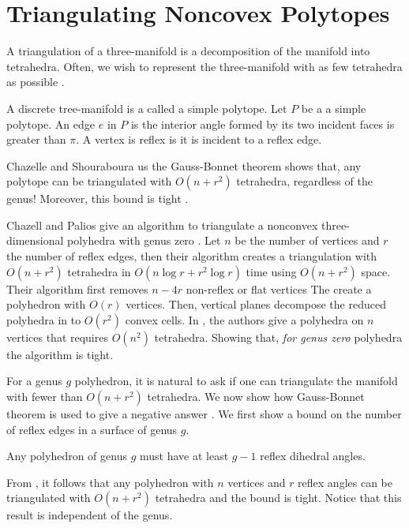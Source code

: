 \section{Triangulating Noncovex Polytopes}
\label{sec:triangulating}

A triangulation of a three-manifold is a decomposition
of the manifold into tetrahedra.
Often, we wish to represent the three-manifold
with as few tetrahedra as possible \cite{simplify-mesh-1999}.

A discrete tree-manifold is a called a simple polytope.
Let $P$ be a a simple polytope. An edge $e$ in $P$ is
 the interior angle formed by its two incident faces
is greater than $\pi$.
A vertex is reflex is it is incident to a reflex edge.


Chazelle and Shouraboura us the 
 Gauss-Bonnet theorem shows that, any polytope
can be triangulated with $O(n+r^2)$ tetrahedra, regardless  of 
the genus! Moreover, this bound is tight \cite{tetra-bounds-c-s-1994}.


Chazell and Palios give an
algorithm to triangulate a nonconvex three-dimensional polyhedra with genus
zero \cite{triangulating-polytope-1990}.
Let $n$ be the number of vertices and $r$ the number of reflex edges,
then their algorithm creates a triangulation with $O(n+r^2)$ tetrahedra 
in $O(n\log r +r^2\log r)$ time using $O(n+r^2)$ space.
Their algorithm first removes $n-4r$ non-reflex or flat vertices
The create a polyhedron with $O(r)$ vertices.
Then, vertical planes decompose the reduced polyhedra in to
$O(r^2)$ convex cells.
In \cite{7}, the authors give a polyhedra on $n$ vertices that requires
$O(n^2)$ tetrahedra. Showing that, \emph{for genus zero} polyhedra
the algorithm is tight.


For a genus $g$ polyhedron, it is natural to ask if one can 
triangulate the manifold with fewer than $O(n+r^2)$ tetrahedra.
We now show how Gauss-Bonnet theorem is used to give a negative answer 
 \cite{tetra-bounds-c-s-1994}.
We first show a bound on the number of reflex edges
in a surface of genus $g$.


\begin{theorem}\label{thm:reflex}

Any polyhedron of genus $g$ must have 
at least $g-1$ reflex dihedral angles. 

\end{theorem}

From , it follows that any polyhedron
with $n$ vertices and $r$ reflex angles
can be triangulated with $O(n+r^2)$ tetrahedra 
and the bound is tight. Notice that this result is independent
of the genus.

